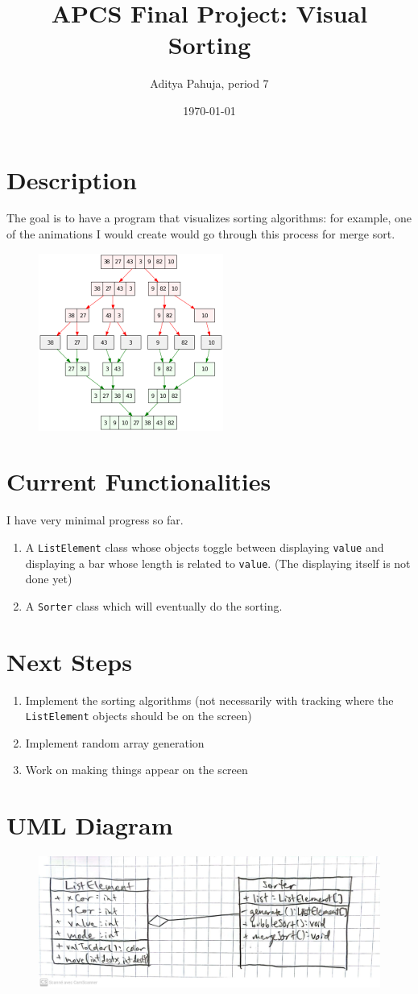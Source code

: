 \documentclass{scrartcl}
\title{APCS Final Project: Visual Sorting}
\author{Aditya Pahuja, period 7}
\date{\today}
\providecommand{\ii}{\item}
\begin{document}
\maketitle
\tableofcontents
\pagebreak

\section{Description}
The goal is to have a program that visualizes sorting algorithms:
for example, one of the animations I would create would go through
this process for merge sort.
\begin{figure}[h]
	\centering
	\includegraphics{mergeSort}
\end{figure}

\section{Current Functionalities}
I have very minimal progress so far.
\begin{enumerate}
	\ii A \texttt{ListElement} class whose objects toggle between
	displaying \texttt{value} and displaying a bar whose length
	is related to \texttt{value}. (The displaying itself is not done yet)
	\ii A \texttt{Sorter} class which will eventually do the sorting.
\end{enumerate}

\section{Next Steps}
\begin{enumerate}
	\ii Implement the sorting algorithms (not necessarily with
	tracking where the \texttt{ListElement} objects should be on the screen)
	\ii Implement random array generation
	\ii Work on making things appear on the screen
\end{enumerate}
\pagebreak
\section{UML Diagram}
\begin{figure}[h]
	\centering
	\includegraphics[scale=0.18]{UML_v1}
\end{figure}
\end{document}
